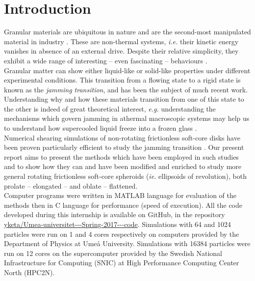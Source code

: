 \documentclass[class=report, float=false, crop=false]{standalone}
\begin{document}
\chapter*{Introduction}
\label{introduction}

Granular materials are ubiquitous in nature and are the second-most manipulated material in industry \cite{patrick2005slow}. These are non-thermal systems, \textit{i.e.} their kinetic energy vanishes in absence of an external drive. Despite their relative simplicity, they exhibit a wide range of interesting -- even fascinating -- behaviours \cite{youtube4}.\\

Granular matter can show either liquid-like or solid-like properties under different experimental conditions. This transition from a flowing state to a rigid state is known as the \textit{jamming transition}, and has been the subject of much recent work. Understanding why and how these materials transition from one of this state to the other is indeed of great theoretical interest, \textit{e.g.} understanding the mechanisms which govern jamming in athermal macroscopic systems may help us to understand how supercooled liquid freeze into a frozen glass \cite{liu1998nonlinear}.\\

Numerical shearing simulations of non-rotating frictionless soft-core disks have been proven particularly efficient to study the jamming transition \cite{PRL99.178001,PRE83.031307}. Our present report aims to present the methods which have been employed in such studies and to show how they can and have been modified and enriched to study more general rotating frictionless soft-core spheroids (\textit{ie.} ellipsoids of revolution), both prolate -- elongated -- and oblate -- flattened.\\

Computer programs were written in MATLAB language for evaluation of the methods then in C language for performance (speed of execution). All the code developed during this internship is available on GitHub, in the repository \href{https://github.com/yketa/Umea-universitet---Spring-2017---code}{yketa/Umea-universitet-{}-{}-Spring-2017-{}-{}-code}. Simulations with 64 and 1024 particles were run on 1 and 4 cores respectively on computers provided by the Department of Physics at Umeå University. Simulations with 16384 particles were run on 12 cores on the supercomputer provided by the Swedish National Infrastructure for Computing (SNIC) at High Performance Computing Center North (HPC2N).\\
\end{document}
